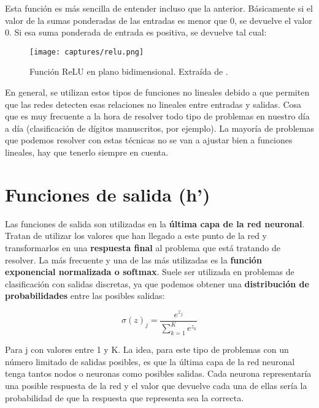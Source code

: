 \documentclass[11pt,fleqn]{book} %
\begin{document}
\begin{itemize}
	Esta función es más sencilla de entender incluso que la anterior. Básicamente si el valor de la sumas ponderadas de las entradas es menor que 0, se devuelve el valor 0. Si esa suma ponderada de entrada es positiva, se devuelve tal cual:
	
	\begin{figure}[H]
		\centering\texttt{[image: captures/relu.png]}
		\caption{Función ReLU en plano bidimensional. Extraída de \cite{article:redNeuronal2}.}
		\label{fig:relu} %
	\end{figure}
\end{itemize}

En general, se utilizan estos tipos de funciones no lineales debido a que permiten que las redes detecten esas relaciones no lineales entre entradas y salidas. Cosa que es muy frecuente a la hora de resolver todo tipo de problemas en nuestro día a día (clasificación de dígitos manuscritos, por ejemplo). La mayoría de problemas que podemos resolver con estas técnicas no se van a ajustar bien a funciones lineales, hay que tenerlo siempre en cuenta.

\section{Funciones de salida (h')}\label{sec:funcionsalida}

Las funciones de salida son utilizadas en la \textbf{última capa de la red neuronal}. Tratan de utilizar los valores que han llegado a este punto de la red y transformarlos en una \textbf{respuesta final} al problema que está tratando de resolver. La más frecuente y una de las más utilizadas es la \textbf{función exponencial normalizada o softmax}. Suele ser utilizada en problemas de clasificación con salidas discretas, ya que podemos obtener una \textbf{distribución de probabilidades} entre las posibles salidas:

\begin{equation}
\sigma(z)_j = \frac{e^{z_j}}{\sum^K_{k=1}e^{z_k}}
\end{equation}

Para j con valores entre 1 y K. La idea, para este tipo de problemas con un número limitado de salidas posibles,  es que la última capa de la red neuronal tenga tantos nodos o neuronas como posibles salidas. Cada neurona representaría una posible respuesta de la red y el valor que devuelve cada una de ellas sería la probabilidad de que la respuesta que representa sea la correcta. \\
\end{document}
